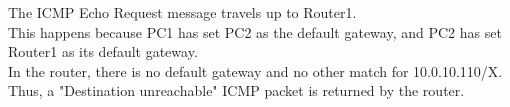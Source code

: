 The ICMP Echo Request message travels up to Router1.\\
This happens because PC1 has set PC2 as the default gateway, and PC2 has set Router1 as its default gateway. 
\\In the router, there is no default gateway and no other match for 10.0.10.110/X. Thus, a "Destination unreachable" ICMP packet is returned by the router.